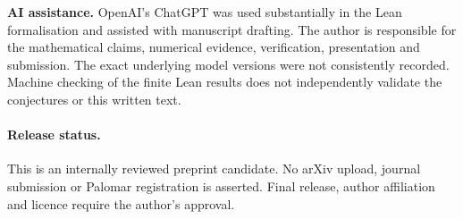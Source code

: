 \textbf{AI assistance.}
OpenAI's ChatGPT was used substantially in the
Lean formalisation and assisted with manuscript
drafting. The author is responsible for the
mathematical claims, numerical evidence,
verification, presentation and submission.
The exact underlying model versions were not
consistently recorded. Machine checking of the
finite Lean results does not independently
validate the conjectures or this written text.

\paragraph{Release status.}
This is an internally reviewed preprint candidate.
No arXiv upload, journal submission or Palomar
registration is asserted. Final release, author
affiliation and licence require the author's approval.
